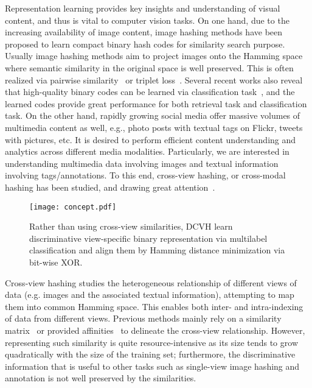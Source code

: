 \documentclass[10pt,twocolumn,letterpaper]{article}
\begin{document}
Representation learning provides key insights and understanding of visual content, and thus is vital to computer vision tasks. On one hand, due to the increasing availability of image content, image hashing methods have been proposed to learn compact binary hash codes for similarity search purpose. Usually image hashing methods aim to project images onto the Hamming space where semantic similarity in the original space is well preserved. This is often realized via pairwise similarity~\cite{Liu_2016_CVPR,dhn} or triplet loss~\cite{Zhuang_2016_CVPR}. Several recent works also reveal that high-quality binary codes can be learned via classification task~\cite{cebits,Shen_2015_CVPR,dbe}, and the learned codes provide great performance for both retrieval task and classification task. On the other hand, rapidly growing social media offer massive volumes of multimedia content as well, e.g., photo posts with textual tags on Flickr, tweets with pictures, etc. It is desired to perform efficient content understanding and analytics across different media modalities. Particularly, we are interested in understanding multimedia data involving images and textual information involving tags/annotations. To this end, cross-view hashing, or cross-modal hashing has been studied, and drawing great attention~\cite{cvh,cmssh,cmfh,seph,acq,dcmh,dvsh}. 
\begin{figure}[t]
	\centering
    		  \texttt{[image: concept.pdf]}
  	\caption{Rather than using cross-view similarities, DCVH learn discriminative view-specific binary representation via multilabel classification and align them by Hamming distance minimization via bit-wise XOR.}
\label{fig:concept}
\end{figure}

Cross-view hashing studies the heterogeneous relationship of different views of data (e.g. images and the associated textual information), attempting to map them into common Hamming space. This enables both inter- and intra-indexing of data from different views. Previous methods mainly rely on a similarity matrix~\cite{dcmh,THN,cvh,cmssh} or provided affinities~\cite{seph,acq} to delineate the cross-view relationship. However, representing such similarity is quite resource-intensive as its size tends to grow quadratically with the size of the training set; furthermore, the discriminative information that is useful to other tasks such as single-view image hashing and annotation is not well preserved by the similarities. 
\end{document}
